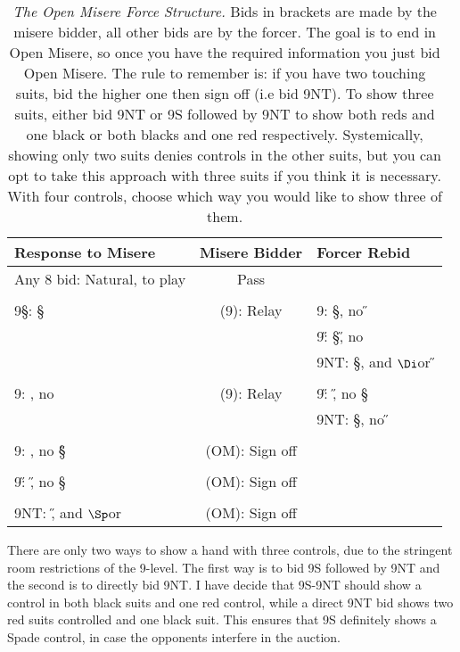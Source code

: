 \documentclass[a4paper]{JoshCards}
\begin{document}
\begin{table}[h!]
  \begin{center}
    \label{tab:table1}
    \begin{tabular}{|l|c|l|}
      \hline
      \textbf{Response to Misere} & \textbf{Misere Bidder} & \textbf{Forcer Rebid}\\
      \hline
      Any 8 bid: Natural, to play & Pass &\\
      &&\\
      9\S: \S & (9\C): Relay 
        & 9\D: \S\D, no \C\H\\
        && 9\H: \S\H, no \C\D\\
        && 9NT: \S\C, and $\D$or \H\\
      &&\\
      9\C: \C, no \D & (9\D): Relay 
        & 9\H: \C\H, no \S\D\\
        && 9NT: \S\C, no \D\H\\
      &&\\
      9\D: \C\D, no \S\H & (OM): Sign off & \\ 
      &&\\
      9\H: \D\H, no \S\C & (OM): Sign off & \\ 
      &&\\
      
      9NT: \D\H, and $\S$or \C & (OM): Sign off & \\
      \hline
    \end{tabular}
  \end{center}
  \caption{\textit{The Open Misere Force Structure.} Bids in brackets are made by the misere bidder, all other bids are by the forcer. The goal is to end in Open Misere, so once you have the required information you just bid Open Misere. The rule to remember is: if you have two touching suits, bid the higher one then sign off (i.e bid 9NT). To show three suits, either bid 9NT or 9S followed by 9NT to show both reds and one black or both blacks and one red respectively. Systemically, showing only two suits denies controls in the other suits, but you can opt to take this approach with three suits if you think it is necessary. With four controls, choose which way you would like to show three of them.}
\end{table}

There are only two ways to show a hand with three controls, due to the stringent room restrictions of the 9-level. The first way is to bid 9S followed by 9NT and the second is to directly bid 9NT. I have decide that 9S-9NT should show a control in both black suits and one red control, while a direct 9NT bid shows two red suits controlled and one black suit. This ensures that 9S definitely shows a Spade control, in case the opponents interfere in the auction.
\end{document}
